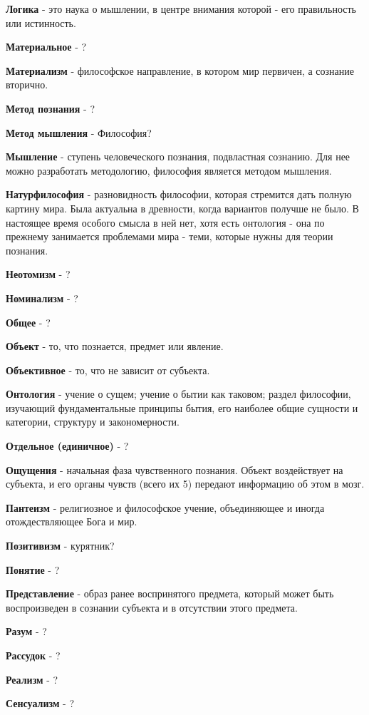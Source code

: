 \documentclass[12pt,a4paper]{article}
\begin{document}
\textbf{Логика} - это наука о мышлении, в центре внимания которой - его правильность или истинность.

\textbf{Материальное} - ?

\textbf{Материализм} - философское направление, в котором мир первичен, а сознание вторично.

\textbf{Метод познания} - ?

\textbf{Метод мышления} - Философия?

\textbf{Мышление} - ступень человеческого познания, подвластная сознанию. Для нее можно разработать методологию, философия является методом мышления.

\textbf{Натурфилософия} - разновидность философии, которая стремится дать полную картину мира. Была актуальна в древности, когда вариантов получше не было. В настоящее время особого смысла в ней нет, хотя есть онтология - она по прежнему занимается проблемами мира - теми, которые нужны для теории познания.

\textbf{Неотомизм} - ?

\textbf{Номинализм} - ?

\textbf{Общее} - ?

\textbf{Объект} - то, что познается, предмет или явление.

\textbf{Объективное} - то, что не зависит от субъекта.

\textbf{Онтология} - учение о сущем; учение о бытии как таковом; раздел философии, изучающий фундаментальные принципы бытия, его наиболее общие сущности и категории, структуру и закономерности.

\textbf{Отдельное (единичное)} - ?

\textbf{Ощущения} -  начальная фаза чувственного познания. Объект воздействует на субъекта, и его органы чувств (всего их 5) передают информацию об этом в мозг.

\textbf{Пантеизм} -  религиозное и философское учение, объединяющее и иногда отождествляющее Бога и мир.

\textbf{Позитивизм} - курятник?

\textbf{Понятие} - ?

\textbf{Представление} - образ ранее воспринятого предмета, который может быть воспроизведен в сознании субъекта и в отсутствии этого предмета.

\textbf{Разум} - ?

\textbf{Рассудок} - ?

\textbf{Реализм} - ?

\textbf{Сенсуализм} - ?
\end{document}
